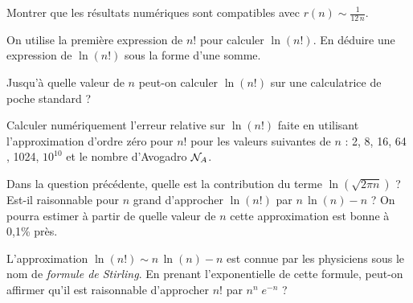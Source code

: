\question
Montrer que les résultats numériques sont compatibles avec $\displaystyle{r(n) \sim \frac{1}{12\, n}}$.

\question
On utilise la première expression de $n!$ pour calculer $\ln{(n!)}$. En déduire une expression de $\ln{(n!)}$ sous la forme d'une somme. 

\question
Jusqu'à quelle valeur de $n$ peut-on calculer $\ln{(n!)}$ sur une calculatrice de poche standard ?

\question
Calculer numériquement l'erreur relative sur $\ln{(n!)}$ faite en utilisant l'approximation d'ordre zéro pour $n!$ pour les valeurs suivantes de $n$ : 2, 8, 16, 64 , 1024, $10^{10}$ et le nombre d'Avogadro ${\cal N}_A$.

\question
Dans la question précédente,  quelle est la contribution du terme $\ln{( \sqrt{2 \pi n})}$ ? Est-il raisonnable pour $n$ grand d'approcher $ \ln{(n!)}$ par $n\,\ln{(n)} - n$ ? On pourra estimer à partir de quelle valeur de $n$ cette approximation est bonne à 0,1\% près.

\question
L'approximation $ \ln{(n!)} \sim n\,\ln{(n)} - n$ est connue par les physiciens sous le nom de \textit{formule de Stirling}. En prenant l'exponentielle de cette formule, peut-on affirmer qu'il est raisonnable d'approcher $n!$ par $ n^n \; e^{-n}$ ?
